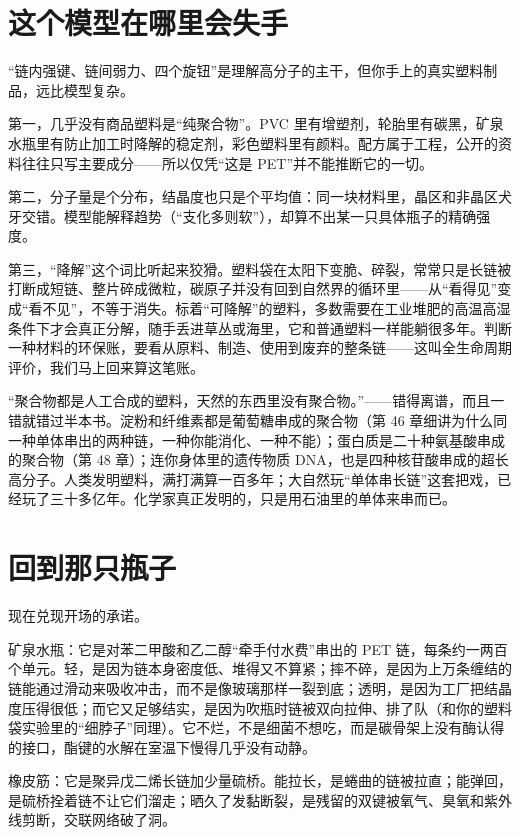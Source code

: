 \section{这个模型在哪里会失手}

“链内强键、链间弱力、四个旋钮”是理解高分子的主干，但你手上的真实塑料制品，远比模型复杂。

第一，几乎没有商品塑料是“纯聚合物”。PVC 里有增塑剂，轮胎里有碳黑，矿泉水瓶里有防止加工时降解的稳定剂，彩色塑料里有颜料。配方属于工程，公开的资料往往只写主要成分——所以仅凭“这是 PET”并不能推断它的一切。

第二，分子量是个分布，结晶度也只是个平均值：同一块材料里，晶区和非晶区犬牙交错。模型能解释趋势（“支化多则软”），却算不出某一只具体瓶子的精确强度。

第三，“降解”这个词比听起来狡猾。塑料袋在太阳下变脆、碎裂，常常只是长链被打断成短链、整片碎成微粒，碳原子并没有回到自然界的循环里——从“看得见”变成“看不见”，不等于消失。标着“可降解”的塑料，多数需要在工业堆肥的高温高湿条件下才会真正分解，随手丢进草丛或海里，它和普通塑料一样能躺很多年。判断一种材料的环保账，要看从原料、制造、使用到废弃的整条链——这叫全生命周期评价，我们马上回来算这笔账。

\begin{wuqu}
“聚合物都是人工合成的塑料，天然的东西里没有聚合物。”——错得离谱，而且一错就错过半本书。淀粉和纤维素都是葡萄糖串成的聚合物（第 46 章细讲为什么同一种单体串出的两种链，一种你能消化、一种不能）；蛋白质是二十种氨基酸串成的聚合物（第 48 章）；连你身体里的遗传物质 DNA，也是四种核苷酸串成的超长高分子。人类发明塑料，满打满算一百多年；大自然玩“单体串长链”这套把戏，已经玩了三十多亿年。化学家真正发明的，只是用石油里的单体来串而已。
\end{wuqu}

\section{回到那只瓶子}

现在兑现开场的承诺。

矿泉水瓶：它是对苯二甲酸和乙二醇“牵手付水费”串出的 PET 链，每条约一两百个单元。轻，是因为链本身密度低、堆得又不算紧；摔不碎，是因为上万条缠结的链能通过滑动来吸收冲击，而不是像玻璃那样一裂到底；透明，是因为工厂把结晶度压得很低；而它又足够结实，是因为吹瓶时链被双向拉伸、排了队（和你的塑料袋实验里的“细脖子”同理）。它不烂，不是细菌不想吃，而是碳骨架上没有酶认得的接口，酯键的水解在室温下慢得几乎没有动静。

橡皮筋：它是聚异戊二烯长链加少量硫桥。能拉长，是蜷曲的链被拉直；能弹回，是硫桥拴着链不让它们溜走；晒久了发黏断裂，是残留的双键被氧气、臭氧和紫外线剪断，交联网络破了洞。

